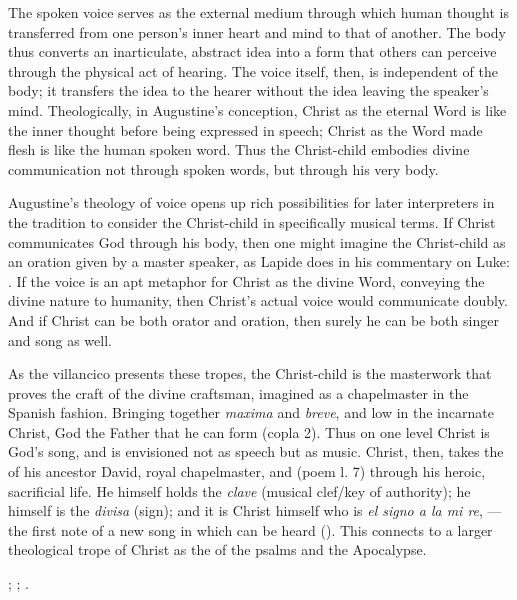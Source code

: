 The spoken voice serves as the external medium through which human thought is
transferred from one person's inner heart and mind to that of another.
The body thus converts an inarticulate, abstract idea into a form that others
can perceive through the physical act of hearing.
The voice itself, then, is independent of the body; it transfers the idea to the
hearer without the idea leaving the speaker's mind.
Theologically, in Augustine's conception, Christ as the eternal Word is like the
inner thought before being expressed in speech; Christ as the Word made flesh is
like the human spoken word.
Thus the Christ-child embodies divine communication not through spoken words,
but through his very body.

Augustine's theology of voice opens up rich possibilities for later interpreters
in the tradition to consider the Christ-child in specifically musical terms.
If Christ communicates God through his body, then one might imagine the
Christ-child as an oration given by a master speaker, as Lapide does in his
commentary on Luke:
.%
    \Autocite
    [673, on : .] 
    {Lapide:Gospels19C} 
If the voice is an apt metaphor for Christ as the divine Word, conveying the
divine nature to humanity, then Christ's actual voice would communicate doubly.
And if Christ can be both orator and oration, then surely he can be both singer
and song as well.

As the villancico  presents these tropes, the
Christ-child is the masterwork that proves the craft of the divine craftsman,
imagined as a chapelmaster in the Spanish fashion.
Bringing together \emph{maxima} and \emph{breve},  and low in the
incarnate Christ, God the Father  that he can form
 (copla 2).
Thus on one level Christ is God's song, and  is envisioned not
as speech but as music.
Christ, then, takes the  of his ancestor David, royal
chapelmaster, and  (poem l. 7) through his heroic,
sacrificial life.
He himself holds the \emph{clave} (musical clef/key of authority); he himself is
the \emph{divisa} (sign); and it is Christ himself who is \emph{el signo a la mi
re}, ---the first note of a new song in which can be heard
 ().
This connects to a larger theological trope of Christ as the 
of the psalms and the Apocalypse.%
\begin{Footnote}
    ; ;
    .
\end{Footnote}

